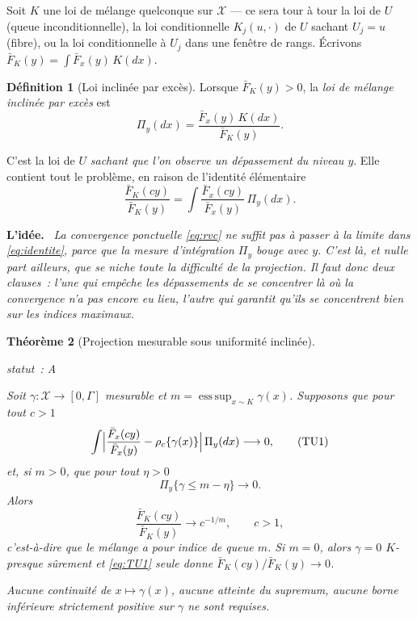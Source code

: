\documentclass[11pt]{article}
\theoremstyle{plain}
\newtheorem{theoreme}{Théorème}[section]
\theoremstyle{definition}
\newtheorem{definition}[theoreme]{Définition}
\theoremstyle{remark}
\DeclareMathOperator*{\esssup}{ess\,sup}
\newcommand{\1}{\mathbf 1}
\newcommand{\statut}[1]{%
  \nopagebreak\par\nopagebreak
  \hfill{\normalfont\footnotesize\textcolor{gris}{statut~: #1}}%
  \par\nopagebreak\vspace{-2pt}}
\newenvironment{idee}
  {\par\medskip\noindent\textcolor{bleu}{\textbf{L'idée.}}\ \itshape}
  {\par\medskip}
\begin{document}
Soit $K$ une loi de mélange quelconque sur $\mathcal X$ --- ce sera tour à
tour la loi de $U$ (queue inconditionnelle), la loi conditionnelle
$K_j(u,\cdot)$ de $U$ sachant $U_j=u$ (fibre), ou la loi conditionnelle à
$U_j$ dans une fenêtre de rangs. Écrivons
$\bar F_K(y)=\int\bar F_x(y)\,K(dx)$.

\begin{definition}[Loi inclinée par excès]
Lorsque $\bar F_K(y)>0$, la \emph{loi de mélange inclinée par excès} est
\begin{equation}
 \Pi_y(dx)=\frac{\bar F_x(y)\,K(dx)}{\bar F_K(y)}.
 \label{eq:tilt}
\end{equation}
\end{definition}

\noindent
C'est la loi de $U$ \emph{sachant que l'on observe un dépassement du
niveau $y$}. Elle contient tout le problème, en raison de l'identité
élémentaire
\begin{equation}
 \frac{\bar F_K(cy)}{\bar F_K(y)}
 =\int\frac{\bar F_x(cy)}{\bar F_x(y)}\,\Pi_y(dx).
 \label{eq:identite}
\end{equation}

\begin{idee}
La convergence ponctuelle \eqref{eq:rvc} ne suffit pas à passer à la
limite dans \eqref{eq:identite}, parce que la mesure d'intégration
$\Pi_y$ \emph{bouge avec $y$}. C'est là, et nulle part ailleurs, que se
niche toute la difficulté de la projection. Il faut donc deux clauses~:
l'une qui empêche les dépassements de se concentrer là où la convergence
n'a pas encore eu lieu, l'autre qui garantit qu'ils se concentrent bien
sur les indices maximaux.
\end{idee}

\begin{theoreme}[Projection mesurable sous uniformité inclinée]
\label{thm:projection}
\statut{A}
Soit $\gamma:\mathcal X\to[0,\Gamma]$ mesurable et
$m=\esssup_{x\sim K}\gamma(x)$. Supposons que pour tout $c>1$
\begin{equation}
 \int\Bigl|\frac{\bar F_x(cy)}{\bar F_x(y)}-\rho_c\{\gamma(x)\}\Bigr|
 \,\Pi_y(dx)\longrightarrow 0,
 \tag{TU1}\label{eq:TU1}
\end{equation}
et, si $m>0$, que pour tout $\eta>0$
\begin{equation}
 \Pi_y\{\gamma\le m-\eta\}\longrightarrow 0 .
 \tag{TU2}\label{eq:TU2}
\end{equation}
Alors
\[
 \frac{\bar F_K(cy)}{\bar F_K(y)}\longrightarrow c^{-1/m},
 \qquad c>1,
\]
c'est-à-dire que le mélange a pour indice de queue $m$. Si $m=0$, alors
$\gamma=0$ $K$-presque sûrement et \eqref{eq:TU1} seule donne
$\bar F_K(cy)/\bar F_K(y)\to0$.

Aucune continuité de $x\mapsto\gamma(x)$, aucune atteinte du supremum,
aucune borne inférieure strictement positive sur $\gamma$ ne sont
requises.
\end{theoreme}
\end{document}
